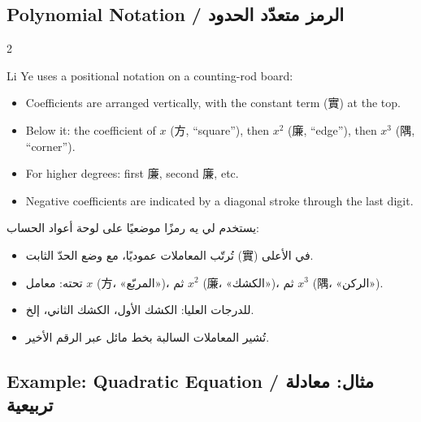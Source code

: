 \documentclass[11pt,a4paper]{article}
\newcommand{\ar}[1]{\arabicfont\beginR #1\endR}
\begin{document}
\subsection{Polynomial Notation / \ar{الرمز متعدّد الحدود}}

\begin{paracol}{2}

Li Ye uses a positional notation on a counting-rod board:
\begin{itemize}[leftmargin=2em]
  \item Coefficients are arranged vertically, with the constant term (實) at the top.
  \item Below it: the coefficient of $x$ (方, ``square''), then $x^2$ (廉, ``edge''), then $x^3$ (隅, ``corner'').
  \item For higher degrees: first 廉, second 廉, etc.
  \item Negative coefficients are indicated by a diagonal stroke through the last digit.
\end{itemize}

\switchcolumn

\ar{يستخدم لي يه رمزًا موضعيًا على لوحة أعواد الحساب:}
\begin{itemize}[leftmargin=2em,rightmargin=0em]
  \item \ar{تُرتّب المعاملات عموديًا، مع وضع الحدّ الثابت (實) في الأعلى.}
  \item \ar{تحته: معامل $x$ (方، «المربّع»)، ثم $x^2$ (廉، «الكشك»)، ثم $x^3$ (隅، «الركن»).}
  \item \ar{للدرجات العليا: الكشك الأول، الكشك الثاني، إلخ.}
  \item \ar{تُشير المعاملات السالبة بخط مائل عبر الرقم الأخير.}
\end{itemize}

\end{paracol}

\vspace{0.5cm}

\subsection{Example: Quadratic Equation / \ar{مثال: معادلة تربيعية}}
\end{document}

